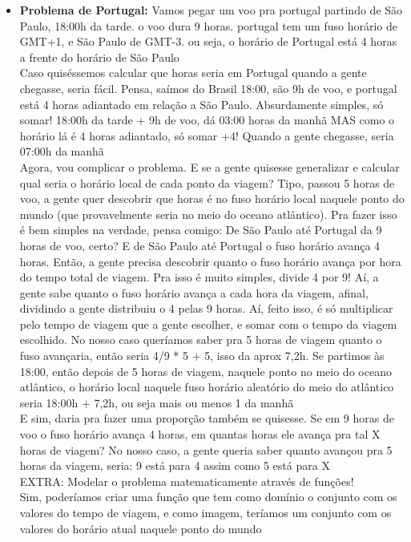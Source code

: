 \documentclass{article}
\begin{document}
\begin{itemize}
    \item \textbf{Problema de Portugal:} Vamos pegar um voo pra portugal partindo de São Paulo, 18:00h da tarde. o voo dura 9 horas. portugal tem um fuso horário de GMT+1, e São Paulo de GMT-3. ou seja, o horário de Portugal está 4 horas a frente do horário de São Paulo
    \\[5pt]
    Caso quiséssemos calcular que horas seria em Portugal quando a gente chegasse, seria fácil. Pensa, saímos do Brasil 18:00, são 9h de voo, e portugal está 4 horas adiantado em relação a São Paulo. Absurdamente simples, só somar! 18:00h da tarde + 9h de voo, dá 03:00 horas da manhã MAS como o horário lá é 4 horas adiantado, só somar +4! Quando a gente chegasse, seria 07:00h da manhã
    \\[5pt]
    Agora, vou complicar o problema. E se a gente quisesse generalizar e calcular qual seria o horário local de cada ponto da viagem? Tipo, passou 5 horas de voo, a gente quer descobrir que horas é no fuso horário local naquele ponto do mundo (que provavelmente seria no meio do oceano atlântico). Pra fazer isso é bem simples na verdade, pensa comigo: De São Paulo até Portugal da 9 horas de voo, certo? E de São Paulo até Portugal o fuso horário avança 4 horas. Então, a gente precisa descobrir quanto o fuso horário avança por hora do tempo total de viagem. Pra isso é muito simples, divide 4 por 9! Aí, a gente sabe quanto o fuso horário avança a cada hora da viagem, afinal, dividindo a gente distribuiu o 4 pelas 9 horas. Aí, feito isso, é só multiplicar pelo tempo de viagem que a gente escolher, e somar com o tempo da viagem escolhido. No nosso caso queríamos saber pra 5 horas de viagem quanto o fuso avançaria, então seria 4/9 * 5 + 5, isso da aprox 7,2h. Se partimos às 18:00, então depois de 5 horas de viagem, naquele ponto no meio do oceano atlântico, o horário local naquele fuso horário aleatório do meio do atlântico seria 18:00h + 7,2h, ou seja mais ou menos 1 da manhã
    \\[5pt]
    E sim, daria pra fazer uma proporção também se quisesse. Se em 9 horas de voo o fuso horário avança 4 horas, em quantas horas ele avança pra tal X horas de viagem? No nosso caso, a gente queria saber quanto avançou pra 5 horas da viagem, seria: 9 está para 4 assim como 5 está para X
    \\[5pt]
    EXTRA: Modelar o problema matematicamente através de funções!
    \\[5pt]
    Sim, poderíamos criar uma função que tem como domínio o conjunto com os valores do tempo de viagem, e como imagem, teríamos um conjunto com os valores do horário atual naquele ponto do mundo

\end{itemize}
\end{document}
